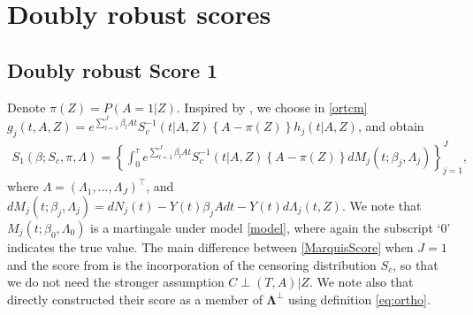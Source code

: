 \documentclass[11pt]{article}
\newcommand{\ee}{\end{eqnarray}}
\newcommand{\eqnn}{\begin{eqnarray*}}
\newcommand{\een}{\end{eqnarray*}}
\newcommand{\be}{\begin{eqnarray}}
\begin{document}
\section{Doubly robust scores}\label{drs}


\subsection*{Doubly robust Score 1}

Denote $\pi(Z)=P(A=1 | Z)$. 
Inspired by \cite{hou2019estimating}, we choose in \eqref{ortcm}
$g_j(t,A,Z)= e^{\sum_{l=1}^J\beta_{l}At} S^{-1}_{c}(t | A,Z) \left\{A-\pi(Z)\right\} h_j(t | A,Z)$,
 and obtain
\be\label{MarquisScore}
{S}_1(\beta ; S_c, \pi, \Lambda)=\left\{\int_0^\tau e^{\sum_{l=1}^J \beta_l A t}S^{-1}_c(t | A,Z)\left\{A -\pi( Z)\right\}dM_j(t; \beta_j, \Lambda_j) \right\}_{j=1}^J, 
\ee
where $ \Lambda = (\Lambda_1, ..., \Lambda_J)^\top$, and  $dM_j(t ; \beta_j, \Lambda_j)= dN_j(t)-Y(t)\beta_j A dt -Y(t) d\Lambda_j(t,Z)$.
We note that $M_j(t ; \beta_0,\Lambda_0) $  is a martingale under model \eqref{model}, where again the subscript `0'  indicates the true value.
The main difference between \eqref{MarquisScore} when $J=1$ and the score from \cite{hou2019estimating} is 
the incorporation of the censoring distribution $S_c$, so that we do not need the stronger assumption $C \perp (T,A) | Z$.
We note also that \cite{hou2019estimating} 
directly constructed their score  as a member of  $\mathbf \Lambda^\perp$ using definition \eqref{eq:ortho}. 
\end{document}
